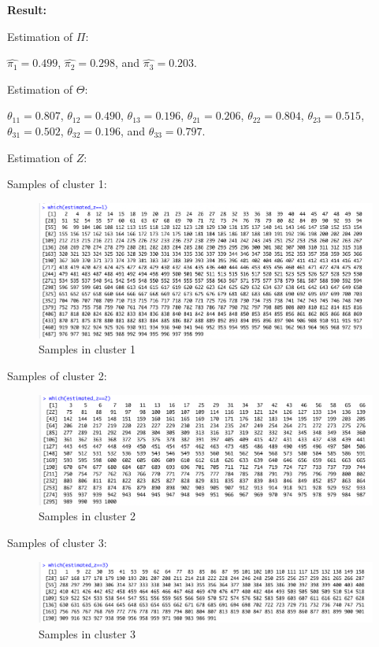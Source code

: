 \documentclass[11pt]{article}
\newcommand\result{\vspace{.10in}\textbf{Result: }}
\begin{document}
\result

Estimation of $\Pi$:

$\hat{\pi_1} = 0.499$, $\hat{\pi_2} = 0.298$, and $\hat{\pi_3} = 0.203$.


Estimation of $\Theta$:

$\theta_{11} = 0.807$, $\theta_{12} = 0.490$, $\theta_{13} = 0.196$, $\theta_{21} = 0.206$,
$\theta_{22} = 0.804$, $\theta_{23} = 0.515$, $\theta_{31} = 0.502$, $\theta_{32} = 0.196$, and $\theta_{33} = 0.797$.

Estimation of $Z$:

Samples of cluster 1:
\begin{figure}[H]
    \centering
    \includegraphics[width=15cm]{figures/z1.png}
    \caption{Samples in cluster 1}
\end{figure}
Samples of cluster 2:
\begin{figure}[H]
    \centering
    \includegraphics[width=14cm]{figures/z2.png}
    \caption{Samples in cluster 2}
\end{figure}
Samples of cluster 3:
\begin{figure}[H]
    \centering
    \includegraphics[width=15cm]{figures/z3.png}
    \caption{Samples in cluster 3}
\end{figure}
\end{document}
